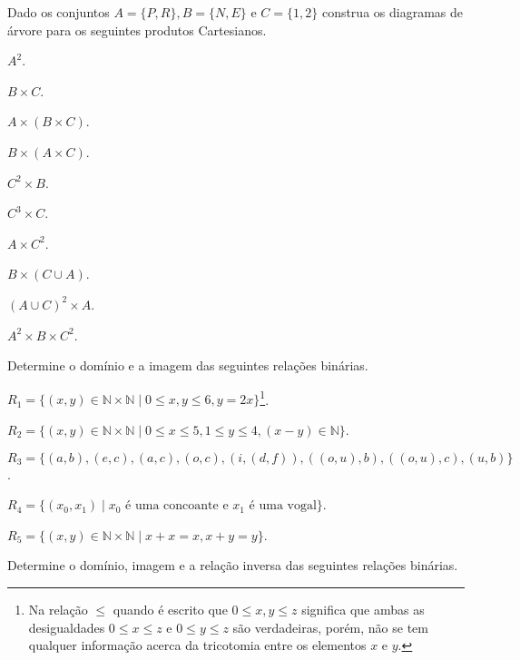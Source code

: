\begin{problem}\label{prob:Relacoes4}
	Dado os conjuntos $A = \{P, R\}, B = \{N, E\}$ e $C = \{1, 2\}$ construa os diagramas de árvore para os seguintes produtos Cartesianos.
\end{problem}

\begin{exerList}
	\item $A^2$.
	\item $B \times C$.
	\item $A \times (B \times C)$.
	\item $B \times (A \times C)$.
	\item $C^2 \times B$.
	\item $C^3 \times C$.
	\item $A \times C^2$.
	\item $B \times (C \cup A)$.
	\item $(A \cup C)^2 \times A$.
	\item $A^2 \times B \times C^2$.
\end{exerList}

\begin{problem}\label{prob:Relacoes5}
	Determine o domínio e a imagem das seguintes relações binárias.
\end{problem}

\begin{exerList}
	\item $R_1 = \{(x, y) \in \mathbb{N} \times \mathbb{N} \mid 0 \leq x, y \leq 6, y = 2x\}$\footnote{Na relação $\leq$ quando é escrito que $0 \leq x, y \leq z$ significa que ambas as desigualdades $0 \leq x\leq z$ e $0 \leq y \leq z$ são verdadeiras, porém, não se tem qualquer informação acerca da tricotomia entre os elementos $x$ e $y$.}.
	\item $R_2 = \{(x, y) \in \mathbb{N} \times \mathbb{N} \mid 0 \leq x \leq 5, 1 \leq y \leq 4, (x-y) \in \mathbb{N} \}$.
	\item $R_3 = \{(a,b), (e, c), (a, c), (o, c), (i, (d,f)), ((o, u), b), ((o, u), c), (u, b) \}$.
	\item $R_4 = \{(x_0, x_1) \mid x_0 \text{ é uma concoante e } x_1 \text{ é uma vogal} \}$.
	\item $R_5 = \{(x, y) \in \mathbb{N} \times \mathbb{N} \mid x + x = x, x + y = y\}$.
\end{exerList}

\begin{problem}\label{prob:Relacoes6}
	Determine o domínio, imagem e a relação inversa das seguintes relações binárias.
\end{problem}

